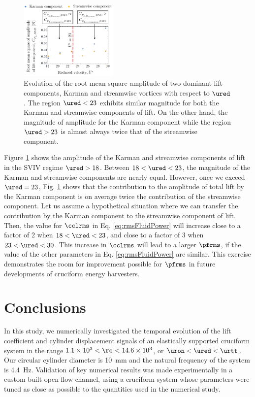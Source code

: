 \documentclass[a4paper,fleqn]{cas-sc}
\begin{document}
\begin{figure}
  \centering
  \includegraphics[width=0.43\textwidth]{figs/figure22}
  \caption{Evolution of the root mean square amplitude of two dominant lift components, Karman and streamwise vortices with respect to $\ured$. The region $\ured < 23$ exhibits similar magnitude for both the Karman and streamwise components of lift. On the other hand, the magnitude of amplitude for the Karman component while the region $\ured > 23$ is almost always twice that of the streamwise component.}
  \label{fig:karmanStreamwiseComponents}
\end{figure}

Figure \ref{fig:karmanStreamwiseComponents} shows the \rms{} amplitude of the Karman and streamwise components of lift in the SVIV regime $\ured > 18$. Between $18 < \ured < 23$, the magnitude of the Karman and streamwise components are nearly equal. However, once we exceed $\ured = 23$, Fig. \ref{fig:karmanStreamwiseComponents} shows that the contribution to the \rms{} amplitude of total lift by the Karman component is on average twice the contribution of the streamwise component. Let us assume a hypothetical situation where we can transfer the contribution by the Karman component to the streamwise component of lift. Then, the value for $\cclrms$ in Eq. \ref{eq:rmsFluidPower} will increase close to a factor of 2 when $18 < \ured < 23$, and close to a factor of 3 when $23 < \ured < 30$. This increase in $\cclrms$ will lead to a larger $\pfrms$, if the value of the other parameters in Eq. \ref{eq:rmsFluidPower} are similar. This exercise demonstrates the room for improvement possible for $\pfrms$ in future developments of cruciform energy harvesters.

\section{Conclusions} \label{sec:conclusions}
In this study, we numerically investigated the temporal evolution of the lift coefficient and cylinder displacement signals of an elastically supported cruciform system in the range $1.1 \times 10^{3} < \re < 14.6 \times 10^{3}$, or $\uron < \ured < \urtt$. Our circular cylinder diameter is \SI{10}{\milli\metre} and the natural frequency of the system is \SI{4.4}{\hertz}. Validation of key numerical results was made experimentally in a custom-built open flow channel, using a cruciform system whose parameters were tuned as close as possible to the quantities used in the numerical study.
\end{document}
